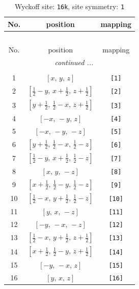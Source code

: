 \documentclass[fleqn,8pt]{jsarticle}
\begin{document}
\begin{longtable}{ccc}
\caption{Wyckoff site: {\tt 16k}, site symmetry: {\tt 1}}
 \\
 \hline \hline
No. & position & mapping \\ \hline \endfirsthead

\multicolumn{2}{l}{\tablename\ \thetable{}} \\
 \hline \hline
No. & position & mapping \\ \hline \endhead

 \hline \hline
\multicolumn{2}{r}{\footnotesize\it continued ...} \\ \endfoot

 \hline \hline
\multicolumn{2}{r}{} \\ \endlastfoot

1 & $\left[ x,\, y,\, z \right]$ & {\tt [1]} \\ \hline
2 & $\left[ \frac{1}{2} - y,\, x + \frac{1}{2},\, z + \frac{1}{2} \right]$ & {\tt [2]} \\ \hline
3 & $\left[ y + \frac{1}{2},\, \frac{1}{2} - x,\, z + \frac{1}{2} \right]$ & {\tt [3]} \\ \hline
4 & $\left[ - x,\, - y,\, z \right]$ & {\tt [4]} \\ \hline
5 & $\left[ - x,\, - y,\, - z \right]$ & {\tt [5]} \\ \hline
6 & $\left[ y + \frac{1}{2},\, \frac{1}{2} - x,\, \frac{1}{2} - z \right]$ & {\tt [6]} \\ \hline
7 & $\left[ \frac{1}{2} - y,\, x + \frac{1}{2},\, \frac{1}{2} - z \right]$ & {\tt [7]} \\ \hline
8 & $\left[ x,\, y,\, - z \right]$ & {\tt [8]} \\ \hline
9 & $\left[ x + \frac{1}{2},\, \frac{1}{2} - y,\, \frac{1}{2} - z \right]$ & {\tt [9]} \\ \hline
10 & $\left[ \frac{1}{2} - x,\, y + \frac{1}{2},\, \frac{1}{2} - z \right]$ & {\tt [10]} \\ \hline
11 & $\left[ y,\, x,\, - z \right]$ & {\tt [11]} \\ \hline
12 & $\left[ - y,\, - x,\, - z \right]$ & {\tt [12]} \\ \hline
13 & $\left[ \frac{1}{2} - x,\, y + \frac{1}{2},\, z + \frac{1}{2} \right]$ & {\tt [13]} \\ \hline
14 & $\left[ x + \frac{1}{2},\, \frac{1}{2} - y,\, z + \frac{1}{2} \right]$ & {\tt [14]} \\ \hline
15 & $\left[ - y,\, - x,\, z \right]$ & {\tt [15]} \\ \hline
16 & $\left[ y,\, x,\, z \right]$ & {\tt [16]} \\
\end{longtable}
\end{document}
